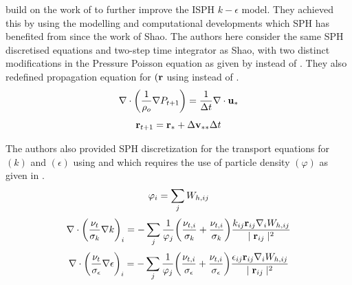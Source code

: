 \cite{Wang2020} build on the work of \cite{Shao2006} to further improve the ISPH $k-\epsilon$ model. They achieved this by using the modelling and computational developments which SPH has benefited from since the work of Shao.
The authors here consider the same SPH discretised equations and two-step time integrator as Shao, with two distinct modifications in the Pressure Poisson equation as given by  instead of . They also redefined propagation equation for $(\mathbf{r}$ using  instead of .
\begin{equation}
    \nabla \cdot \bigg( \frac{1}{\rho_o} \nabla P_{t+1} \bigg) = \frac{1}{\Delta t} \nabla \cdot \mathbf{u_*}
    \label{eq:Wang2020-correct-pressure-implicit}
\end{equation}
\begin{equation}
    \mathbf{r}_{t+1} = \mathbf{r}_* + \Delta \mathbf{v}_{**} \Delta t
    \label{eq:Wang2020-correct-end}
\end{equation}

The authors also provided SPH discretization for the transport equations for $(k)$ and $(\epsilon)$ using  and  which requires the use of particle density $(\varphi)$ as given in .
\begin{equation}
    \varphi_i = \sum_j W_{h, ij}
    \label{eq:Wang2020-particle-density}
\end{equation}
\begin{equation}
    \nabla \cdot \bigg( \frac{\nu_t}{\sigma_k} \nabla k \bigg)_i = - \sum_j \frac{1}{\varphi_j} \bigg( \frac{\nu_{t,i}}{\sigma_k} + \frac{\nu_{t,i}}{\sigma_k}  \bigg) \frac{k_{ij} \mathbf{r}_{ij} \nabla_{i} W_{h, ij}}{\mid \mathbf{r}_{ij} \mid^{2}}
    \label{eq:Wang2020-k-laplacian}
\end{equation}
\begin{equation}
    \nabla \cdot \bigg( \frac{\nu_t}{\sigma_{\epsilon}} \nabla \epsilon \bigg)_i = - \sum_j \frac{1}{\varphi_j} \bigg( \frac{\nu_{t,i}}{\sigma_{\epsilon}} + \frac{\nu_{t,i}}{\sigma_{\epsilon}}  \bigg) \frac{\epsilon_{ij} \mathbf{r}_{ij} \nabla_{i} W_{h, ij}}{\mid \mathbf{r}_{ij} \mid^{2}}
    \label{eq:Wang2020-eps-laplacian}
\end{equation}

